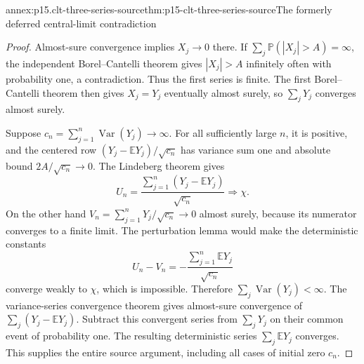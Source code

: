 \begin{annexitem}{annex:p15.clt-three-series-source}{thm:p15-clt-three-series-source}{The formerly deferred central-limit contradiction}
\begin{proof}
Almost-sure convergence implies \(X_j\to0\) there.
If \(\sum_j\mathbb P(|X_j|>A)=\infty\), the independent
Borel--Cantelli theorem gives \(|X_j|>A\) infinitely often with
probability one, a contradiction. Thus the first series is finite.
The first Borel--Cantelli theorem then gives \(X_j=Y_j\)
eventually almost surely, so \(\sum_jY_j\) converges almost surely.

Suppose \(c_n=\sum_{j=1}^n\operatorname{Var}(Y_j)\to\infty\).
For all sufficiently large \(n\), it is positive, and the centered
row \((Y_j-\mathbb EY_j)/\sqrt{c_n}\) has variance sum one
and absolute bound \(2A/\sqrt{c_n}\to0\).
The Lindeberg theorem gives
\[
 U_n=\frac{\sum_{j=1}^n(Y_j-\mathbb EY_j)}{\sqrt{c_n}}
                                               \Rightarrow\chi.
 \]
On the other hand
\(V_n=\sum_{j=1}^nY_j/\sqrt{c_n}\to0\) almost surely,
because its numerator converges to a finite limit.
The perturbation lemma would make the deterministic constants
\[
 U_n-V_n=-\frac{\sum_{j=1}^n\mathbb EY_j}{\sqrt{c_n}}
 \]
converge weakly to \(\chi\), which is impossible.
Therefore \(\sum_j\operatorname{Var}(Y_j)<\infty\).
The variance-series convergence theorem gives almost-sure
convergence of \(\sum_j(Y_j-\mathbb EY_j)\). Subtract this
convergent series from \(\sum_jY_j\) on their common event
of probability one. The resulting deterministic series
\(\sum_j\mathbb EY_j\) converges. This supplies the entire
source argument, including all cases of initial zero \(c_n\).
\end{proof}
\end{annexitem}

